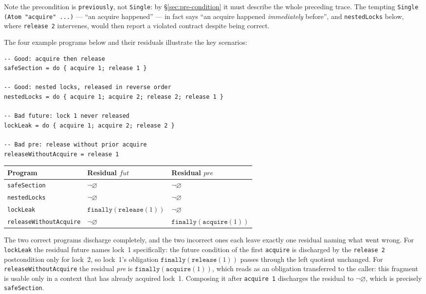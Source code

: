 \documentclass[acmsmall,screen]{acmart}
\newcommand{\pre}{\mathit{pre}}
\newcommand{\fut}{\mathit{fut}}
\newcommand{\finally}[1]{\mathtt{finally}(#1)}
\newcommand{\univ}{\neg\varnothing}
\begin{document}
\noindent
Note the precondition is \lstinline{previously}, not
\lstinline{Single}: by \S\ref{sec:pre-condition} it must describe the whole
preceding trace.
The tempting \lstinline{Single (Atom "acquire" ...)} --- ``an acquire
happened'' --- in fact says ``an acquire happened \emph{immediately}
before'', and \lstinline{nestedLocks} below, where \lstinline{release 2}
intervenes, would then report a violated contract despite being correct.

\noindent
The four example programs below and their residuals illustrate the key
scenarios:

\begin{lstlisting}
-- Good: acquire then release
safeSection = do { acquire 1; release 1 }

-- Good: nested locks, released in reverse order
nestedLocks = do { acquire 1; acquire 2; release 2; release 1 }

-- Bad future: lock 1 never released
lockLeak = do { acquire 1; acquire 2; release 2 }

-- Bad pre: release without prior acquire
releaseWithoutAcquire = release 1
\end{lstlisting}

\begin{center}
\begin{tabular}{lll}
\toprule
Program & Residual $\fut$ & Residual $\pre$ \\
\midrule
\lstinline{safeSection}            & $\univ$ & $\univ$ \\
\lstinline{nestedLocks}            & $\univ$ & $\univ$ \\
\lstinline{lockLeak}               & $\finally{\mathtt{release}(1)}$ & $\univ$ \\
\lstinline{releaseWithoutAcquire}  & $\univ$ & $\finally{\mathtt{acquire}(1)}$ \\
\bottomrule
\end{tabular}
\end{center}

\noindent
The two correct programs discharge completely, and the two incorrect ones
each leave exactly one residual naming what went wrong.
For \lstinline{lockLeak} the residual future names lock~1 specifically:
the future condition of the first \lstinline{acquire} is discharged by the
\lstinline{release 2} postcondition only for lock~2, so lock~1's obligation
$\finally{\mathtt{release}(1)}$ passes through the left quotient unchanged.
For \lstinline{releaseWithoutAcquire} the residual \emph{pre} is
$\finally{\mathtt{acquire}(1)}$, which reads as an obligation transferred to
the caller: this fragment is usable only in a context that has already
acquired lock~1.
Composing it after \lstinline{acquire 1} discharges the residual to $\univ$,
which is precisely \lstinline{safeSection}.
\end{document}
